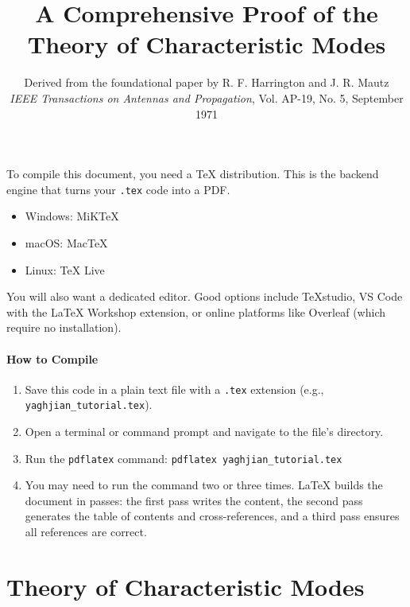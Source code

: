 \documentclass[11pt,a4paper]{article}
\begin{document}
To compile this document, you need a TeX distribution. This is the backend engine that turns your \texttt{.tex} code into a PDF.
\begin{itemize}
    \item Windows: MiKTeX
    \item macOS: MacTeX
    \item Linux: TeX Live
\end{itemize}
You will also want a dedicated editor. Good options include TeXstudio, VS Code with the LaTeX Workshop extension, or online platforms like Overleaf (which require no installation).

\subsection{How to Compile}
\begin{enumerate}
    \item Save this code in a plain text file with a \texttt{.tex} extension (e.g., \texttt{yaghjian\_tutorial.tex}).
    \item Open a terminal or command prompt and navigate to the file's directory.
    \item Run the \texttt{pdflatex} command: \texttt{pdflatex yaghjian\_tutorial.tex}
    \item You may need to run the command two or three times. \LaTeX{} builds the document in passes: the first pass writes the content, the second pass generates the table of contents and cross-references, and a third pass ensures all references are correct.
\end{enumerate}

\newpage


\part{Theory of Characteristic Modes}

\title{A Comprehensive Proof of the Theory of Characteristic Modes}
\author{Derived from the foundational paper by R. F. Harrington and J. R. Mautz \\ \textit{IEEE Transactions on Antennas and Propagation}, Vol. AP-19, No. 5, September 1971}
\date{}
\maketitle
\end{document}
